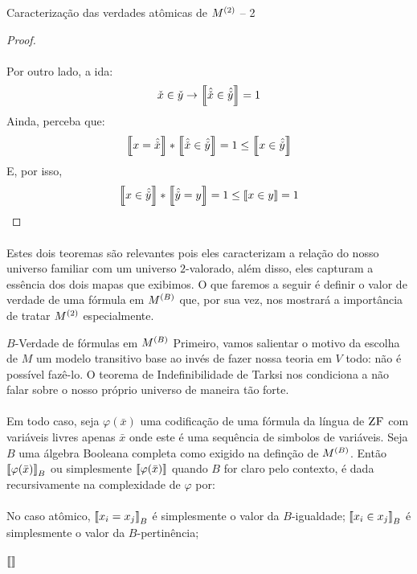 \begin{theorem}{Caracterização das verdades atômicas de $M^{(2)}$ -- 2}
\begin{proof}
            \paragraph{}
                Por outro lado, a ida:
                $$\check x \in \check y \rightarrow \left\llbracket\hat{\check x} \in \hat{\check y}\right\rrbracket = 1$$ 
                Ainda, perceba que:
                $$\left\llbracket x = \hat{\check x}\right\rrbracket * \left\llbracket\hat{\check x} \in \hat{\check y}\right\rrbracket = 1 \leq \left\llbracket x \in \hat{\check y}\right\rrbracket$$
                E, por isso,
                $$\left\llbracket x \in \hat{\check y}\right\rrbracket * \left\llbracket\hat{\check y} = y\right\rrbracket = 1 \leq \left\llbracket x \in y\right\rrbracket = 1$$\eop
        \end{proof}
    \end{theorem}
    \paragraph{}
        Estes dois teoremas são relevantes pois eles caracterizam a relação do nosso universo familiar com 
        um universo $2$-valorado, além disso, eles capturam a essência dos dois mapas que exibimos. O que 
        faremos a seguir é definir o valor de verdade de uma fórmula em $M^{(B)}$ que, por sua vez, nos 
        mostrará a importância de tratar $M^{(2)}$ especialmente.
    \begin{definition}{$B$-Verdade de fórmulas em $M^{(B)}$}
        Primeiro, vamos salientar o motivo da escolha de $M$ um modelo transitivo base ao invés de fazer 
        nossa teoria em $V$ todo: não é possível fazê-lo. O teorema de Indefinibilidade de Tarksi nos 
        condiciona a não falar sobre o nosso próprio universo de maneira tão forte.
        \paragraph{}
            Em todo caso, seja $\varphi(\bar{x})$ uma codificação de uma fórmula da língua de $\text{\sc ZF}$ com 
            variáveis livres apenas $\bar{x}$ onde este é uma sequência de simbolos de variáveis. Seja 
            $B$ uma álgebra Booleana completa como exigido na definção de $M^{(B)}$. Então 
            $\left\llbracket\varphi(\bar x)\right\rrbracket_B$ ou simplesmente $\left\llbracket\varphi(\bar x)\right\rrbracket$ quando $B$ for claro pelo 
            contexto, é dada recursivamente na complexidade de $\varphi$ por:
        \paragraph{}
            No caso atômico,
            $\left\llbracket x_i = x_j\right\rrbracket_B$ é simplesmente o valor da $B$-igualdade; $\left\llbracket x_i \in x_j\right\rrbracket_B$ é simplesmente o valor da $B$-pertinência;
        \paragraph{}
            $\left\llbracket\right\rrbracket$
        
    \end{definition}